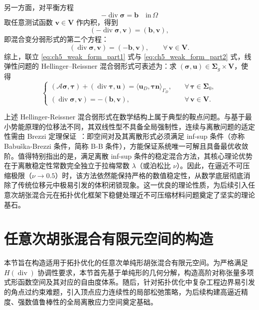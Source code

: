 另一方面，对平衡方程
\[
-\operatorname{div}\boldsymbol{\sigma} = \boldsymbol{b}\quad\text{in}\,\Omega
\]
取任意测试函数 $\boldsymbol{v}\in\boldsymbol{V}$ 作内积，得到
\[
(-\operatorname{div}\boldsymbol{\sigma},\boldsymbol{v}) = (\boldsymbol{b},\boldsymbol{v}),
\]
即混合变分弱形式的第二个方程：
\begin{equation}
	(\operatorname{div}\boldsymbol{\sigma},\boldsymbol{v}) =(-\boldsymbol{b},\boldsymbol{v}), \qquad\forall\,\boldsymbol{v}\in\boldsymbol{V}.
	\label{eq:ch5_weak_form_part2}
\end{equation}
综上，联立 \eqref{eq:ch5_weak_form_part1} 式与 \eqref{eq:ch5_weak_form_part2} 式，线弹性问题的 Hellinger–Reissner 混合弱形式可表述为：求 $(\boldsymbol{\sigma},\boldsymbol{u})\in\boldsymbol{\Sigma}_g\times\boldsymbol{V}$，使得
\begin{equation} 
	\begin{cases} 
		(\mathcal{A}\boldsymbol{\sigma},\boldsymbol{\tau}) + (\operatorname{div}\boldsymbol{\tau}, \boldsymbol{u}) =\langle\boldsymbol{u}_D,\boldsymbol{\tau}\boldsymbol{n}\rangle_{\Gamma_D}, &\quad \forall\,\boldsymbol{\tau}\in\boldsymbol{\Sigma}_0,\\[0.4em] 
		(\operatorname{div}\boldsymbol{\sigma},\boldsymbol{v}) = -(\boldsymbol{b},\boldsymbol{v}), &\quad \forall\,\boldsymbol{v}\in\boldsymbol{V}. 
	\end{cases}
	\label{eq:ch5_hr_weak_form}
\end{equation}

上述 Hellinger-Reissner 混合弱形式在数学结构上属于典型的鞍点问题。与基于最小势能原理的位移法不同，其双线性型不具备全局强制性，连续与离散问题的适定性需由 Brezzi 定理保证~\cite{brezziMixedHybridFinite1991}：即空间对及其离散形式必须满足 inf-sup 条件（亦称 Babuška-Brezzi 条件，简称 B-B 条件），方能保证系统唯一可解且具备最优收敛阶。值得特别指出的是，满足离散 inf-sup 条件的稳定混合方法，其核心理论优势在于离散稳定性常数完全独立于拉梅常数 $\lambda$（或泊松比 $\nu$）。因此，在逼近不可压缩极限（$\nu\to 0.5$）时，该方法依然能保持严格的数值稳定性，从数学底层彻底消除了传统位移元中极易引发的体积闭锁现象。这一优良的理论性质，为后续引入任意次胡张混合元在拓扑优化框架下稳健处理近不可压缩材料问题奠定了坚实的理论基石。


\section{任意次胡张混合有限元空间的构造}
\label{sec:hz_space_construction}

本节旨在构造适用于拓扑优化的任意次单纯形胡张混合有限元空间。为严格满足 $H(\operatorname{div})$ 协调性要求，本节首先基于单纯形的几何分解，构造高阶对称张量多项式形函数空间及其对应的自由度体系。随后，针对拓扑优化中复杂工程边界易引发的角点过约束难题，引入顶点应力连续性的局部松弛策略，为后续构建高逼近精度、强数值鲁棒性的全局离散应力空间奠定基础。


